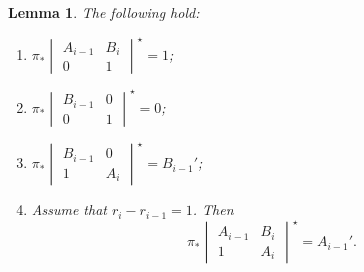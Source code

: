\documentclass[11pt]{article}
\numberwithin{equation}{section}
\numberwithin{equation}{section}
\newtheorem{Lemma}[Theorem]{Lemma}
\theoremstyle{definition}
\begin{document}
\begin{Lemma}\label{lemma:main-push} The following hold:
 \begin{enumerate}[label=$(\alph*)$]\itemsep=0pt
 \item $\pi_* \begin{vmatrix}
 A_{i-1} & B_i\\
 0 & 1
 \end{vmatrix}^\star= 1$;
 \item $\pi_* \begin{vmatrix}
 B_{i-1} & 0\\
 0 & 1
 \end{vmatrix}^\star = 0$;
 \item $\pi_* \begin{vmatrix} B_{i-1} & 0\\ 1 & A_{i} \end{vmatrix}^\star = B_{i-1}'$;
 \item Assume that $r_i - r_{i-1} = 1$. Then
 \[
 \pi_* \begin{vmatrix} A_{i-1} & B_i\\1 & A_i
 \end{vmatrix}^\star = A_{i-1}'.
 \]
 \end{enumerate}
 \end{Lemma}
\end{document}
